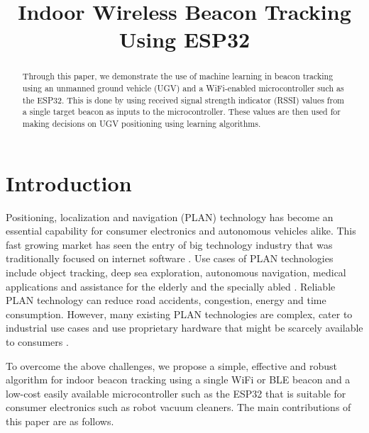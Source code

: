 \documentclass[conference]{IEEEtran}
\begin{document}
\title{Indoor Wireless Beacon Tracking Using ESP32}
\author{
}
\maketitle
\placelogo

\begin{abstract}
    Through this paper, we demonstrate the use of machine learning in beacon
    tracking using an unmanned ground vehicle (UGV) and a WiFi-enabled
    microcontroller such as the ESP32. This is done by using received signal
    strength indicator (RSSI) values from a single target beacon as inputs to
    the microcontroller. These values are then used for making decisions on UGV
    positioning using learning algorithms. 
\end{abstract}

\section{Introduction}
\label{sec:intro}
Positioning, localization and navigation (PLAN) technology has become an
essential capability for consumer electronics and autonomous vehicles alike.
This fast growing market has seen the entry of big technology industry that was
traditionally focused on internet software
\cite{el-sheimyIndoorNavigationState2021}. Use cases of PLAN technologies
include object tracking, deep sea exploration, autonomous navigation, medical
applications and assistance for the elderly and the specially abled
\cite{laoudiasSurveyEnablingTechnologies2018,farahsariSurveyIndoorPositioning2022}.
Reliable PLAN technology can reduce road accidents, congestion, energy and time
consumption. However, many existing PLAN technologies are complex, cater to
industrial use cases and use proprietary hardware that might be scarcely
available to consumers
\cite{guSurveyIndoorPositioning2009,liuSurveyWirelessIndoor2007}.

To overcome the above challenges, we propose a simple, effective and robust
algorithm for indoor beacon tracking using a single WiFi or BLE beacon and a
low-cost easily available microcontroller such as the ESP32 that is suitable for
consumer electronics such as robot vacuum cleaners. The main contributions of
this paper are as follows.
\end{document}
